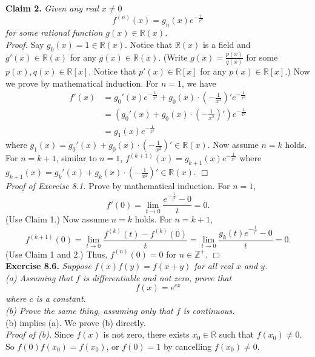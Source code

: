 \documentclass{article}
\begin{document}
\textbf{Claim 2.}
\emph{Given any real $x \neq 0$
$$f^{(n)}(x) = g_n(x) e^{-\frac{1}{x^2}}$$
for some rational function $g(x) \in \mathbb{R}(x)$.} \\

\emph{Proof.}
Say $g_0(x) = 1 \in \mathbb{R}(x)$.
Notice that $\mathbb{R}(x)$ is a field and
$g'(x) \in \mathbb{R}(x)$ for any $g(x) \in \mathbb{R}(x)$.
(Write $g(x) = \frac{p(x)}{q(x)}$ for some $p(x), q(x) \in \mathbb{R}[x]$.
Notice that $p'(x) \in \mathbb{R}[x]$ for any $p(x) \in \mathbb{R}[x]$.)
Now we prove by mathematical induction.
For $n = 1$, we have
\begin{align*}
f'(x)
&= g_0'(x) e^{-\frac{1}{x^2}}
+ g_0(x) \cdot \left( -\frac{1}{x^2} \right)' e^{-\frac{1}{x^2}} \\
&= \left( g_0'(x) + g_0(x) \cdot \left( -\frac{1}{x^2} \right)' \right) e^{-\frac{1}{x^2}} \\
&= g_1(x) e^{-\frac{1}{x^2}}
\end{align*}
where $g_1(x) = g_0'(x) + g_0(x) \cdot (-\frac{1}{x^2})' \in \mathbb{R}(x)$.
Now assume $n = k$ holds.
For $n = k + 1$, similar to $n = 1$,
$f^{(k + 1)}(x) = g_{k + 1}(x) e^{-\frac{1}{x^2}}$
where $g_{k + 1}(x) = g_k'(x) + g_k(x) \cdot (-\frac{1}{x^2})' \in \mathbb{R}(x)$.
$\Box$ \\

\emph{Proof of Exercise 8.1.}
Prove by mathematical induction.
For $n = 1$,
$$f'(0) = \lim_{t \rightarrow 0} \frac{e^{- \frac{1}{t^2}} - 0}{t} = 0.$$
(Use Claim 1.)
Now assume $n = k$ holds.
For $n = k + 1$,
$$f^{(k + 1)}(0)
= \lim_{t \rightarrow 0} \frac{f^{(k)}(t) - f^{(k)}(0)}{t}
= \lim_{t \rightarrow 0} \frac{g_k(t) e^{- \frac{1}{t^2}} - 0}{t} = 0.$$
(Use Claim 1 and 2.)
Thus, $f^{(n)}(0) = 0$ for $n \in \mathbb{Z}^+$.
$\Box$ \\



\textbf{Exercise 8.6.}
\emph{Suppose $f(x)f(y) = f(x + y)$ for all real $x$ and $y$. \\
(a) Assuming that $f$ is differentiable and not zero, prove that
$$f(x) = e^{cx}$$
where $c$ is a constant. \\
(b) Prove the same thing, assuming only that $f$ is continuous.} \\

(b) implies (a). We prove (b) directly. \\

\emph{Proof of (b).}
Since $f(x)$ is not zero, there exists $x_0 \in \mathbb{R}$ such that $f(x_0) \neq 0$.
So $f(0)f(x_0) = f(x_0)$, or $f(0) = 1$ by cancelling $f(x_0) \neq 0$. \\
\end{document}
